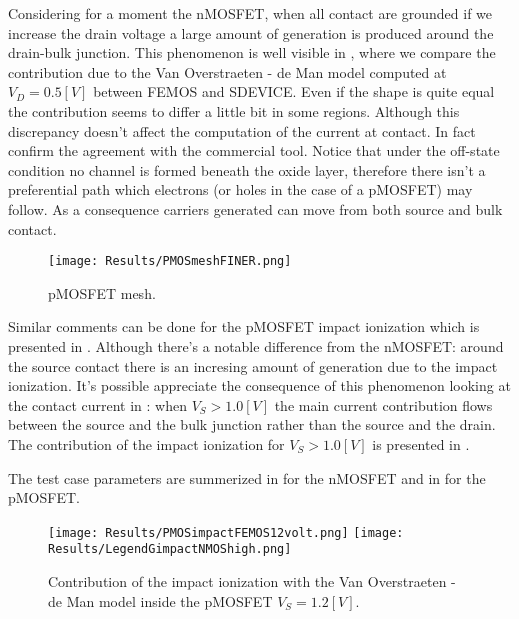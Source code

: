 Considering for a moment the nMOSFET, when all contact are grounded if we increase the drain voltage a large amount of generation is produced around the drain-bulk junction. This phenomenon is well visible in , where we compare the contribution due to the Van Overstraeten - de Man model computed at $V_D = 0.5 [V]$ between FEMOS and SDEVICE. Even if the shape is quite equal the contribution seems to differ a little bit in some regions. Although this discrepancy doesn't affect the computation of the current at contact. In fact  confirm the agreement with the commercial tool. Notice that under the off-state condition no channel is formed beneath the oxide layer, therefore there isn't a preferential path which electrons (or holes in the case of a pMOSFET) may follow. As a consequence carriers generated can move from both source and bulk contact. 

\begin{figure}[!t]
\vspace{0.5cm}
\centering
{\texttt{[image: Results/PMOSmeshFINER.png]}}
\caption{pMOSFET mesh.}
\label{fig: mesh finer pMOS}
\vspace{0.5cm}
\end{figure}

Similar comments can be done for the pMOSFET impact ionization which is presented in . Although there's a notable difference from the nMOSFET: around the source contact  there is an incresing amount of generation due to the impact ionization. It's possible appreciate the consequence of this phenomenon looking at the contact current in : when $V_S>1.0[V]$ the main current contribution flows between the source and the bulk junction rather than the source and the drain. The contribution of the impact ionization for $V_S>1.0[V]$ is presented in .

The test case parameters are summerized in  for the nMOSFET and in  for the pMOSFET.

\begin{figure}[!h]
\vspace{0.5cm}
\centering
{\texttt{[image: Results/PMOSimpactFEMOS12volt.png]}}
\hspace{0.04\textwidth}
{\texttt{[image: Results/LegendGimpactNMOShigh.png]}}
\caption{Contribution of the impact ionization with the Van Overstraeten - de Man model inside the pMOSFET $V_S=1.2[V]$.}
\label{fig: II pMOS high}
\vspace{0.5cm}
\end{figure}


